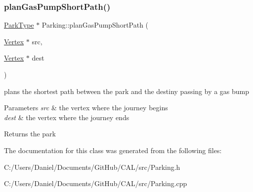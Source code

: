 \subsubsection{\texorpdfstring{plan\+Gas\+Pump\+Short\+Path()}{planGasPumpShortPath()}}
{\footnotesize\ttfamily \hyperlink{class_park_type}{Park\+Type} $\ast$ Parking\+::plan\+Gas\+Pump\+Short\+Path (\begin{DoxyParamCaption}\item[{\hyperlink{class_vertex}{Vertex} $\ast$}]{src,  }\item[{\hyperlink{class_vertex}{Vertex} $\ast$}]{dest }\end{DoxyParamCaption})}



plans the shortest path between the park and the destiny passing by a gas bump 


\begin{DoxyParams}{Parameters}
{\em src} & the vertex where the journey begins\\
\hline
{\em dest} & the vertex where the journey ends\\
\hline
\end{DoxyParams}
\begin{DoxyReturn}{Returns}
the park 
\end{DoxyReturn}


The documentation for this class was generated from the following files\+:\begin{DoxyCompactItemize}
\item 
C\+:/\+Users/\+Daniel/\+Documents/\+Git\+Hub/\+C\+A\+L/src/Parking.\+h\item 
C\+:/\+Users/\+Daniel/\+Documents/\+Git\+Hub/\+C\+A\+L/src/Parking.\+cpp\end{DoxyCompactItemize}
